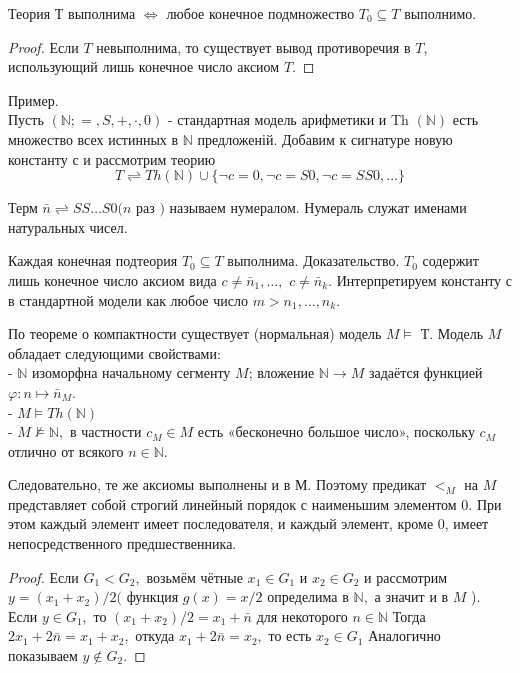 \begin{theo}
Теория Т выполнима $\Longleftrightarrow$ любое конечное подмножество $T_{0} \subseteq T$ выполнимо.
\end{theo}
\begin{proof}
Если $T$ невыполнима, то существует вывод противоречия в $T$, использующий лишь конечное число аксиом $T$.
\end{proof}

Пример.\\
Пусть $(\mathbb{N} ;=, S,+, \cdot, 0)$ - стандартная модель арифметики и Th $(\mathbb{N})$ есть множество всех истинных в $\mathbb{N}$ предложеній.
Добавим к сигнатуре новую константу с и рассмотрим теорию
$$
T \rightleftharpoons T h(\mathbb{N}) \cup\{\neg c=0, \neg c=S 0, \neg c=S S 0, \ldots\}
$$

Терм $\bar{n} \rightleftharpoons S S \ldots S 0(n$ раз $)$ называем нумералом. Нумераль служат именами натуральных чисел.
\begin{lem}
Каждая конечная подтеория $T_{0} \subseteq T$ выполнима.
Доказательство. $T_{0}$ содержит лишь конечное число аксиом вида $c \neq \bar{n}_{1}, \ldots,$ $c \neq \bar{n}_{k} .$ Интерпретируем константу с в стандартной модели как любое число $m>n_{1}, \ldots, n_{k} .$
\end{lem}

По теореме о компактности существует (нормальная) модель $M \vDash$ Т. Модель $M$ обладает следующими свойствами:\\
- $\mathbb{N}$ изоморфна начальному сегменту $M$; вложение $\mathbb{N} \rightarrow M$ задаётся функцией $\varphi: n \longmapsto \bar{n}_{M}$.\\
- $M \vDash T h(\mathbb{N})$\\
- $M \not \models \mathbb{N},$ в частности $c_{M} \in M$ есть «бесконечно большое число», поскольку $c_{M}$ отлично от всякого $n \in \mathbb{N}$.
\vskip 0.2in

Следовательно, те же аксиомы выполнены и в М. Поэтому предикат $<_{M}$ на $M$ представляет собой строгий линейный порядок с наименьшим элементом 0. При этом каждый элемент имеет последователя, и каждый элемент, кроме 0,
имеет непосредственного предшественника.

\begin{proof}
Если $G_{1}<G_{2},$ возьмём чётные $x_{1} \in G_{1}$ и $x_{2} \in G_{2}$ и рассмотрим $y=\left(x_{1}+x_{2}\right) / 2($ функция $g(x)=x / 2$ определима в $\mathbb{N},$ а значит и в $M$ ).
Если $y \in G_{1},$ то $\left(x_{1}+x_{2}\right) / 2=x_{1}+\bar{n}$ для некоторого $n \in \mathbb{N}$ Тогда $2 x_{1}+2 \bar{n}=x_{1}+x_{2},$ откуда $x_{1}+2 \bar{n}=x_{2},$ то есть $x_{2} \in G_{1}$
Аналогично показываем $y \notin G_{2}$.
\end{proof}